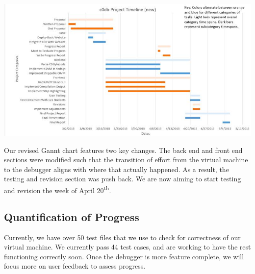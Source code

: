 \includegraphics{gannt}

Our revised Gannt chart features two key changes. The back end and front end
sections were modified such that the transition of effort from the virtual
machine to the debugger aligns with where that actually happened. As a result,
the testing and revision section was push back. We are now aiming to start
testing and revision the week of April 20\textsuperscript{th}.

\subsection*{Quantification of Progress}
Currently, we have over 50 test files that we use to check for correctness of
our virtual machine. We currently pass 44 test cases, and are working to have
the rest functioning correctly soon. Once the debugger is more feature complete,
we will focus more on user feedback to assess progress.

